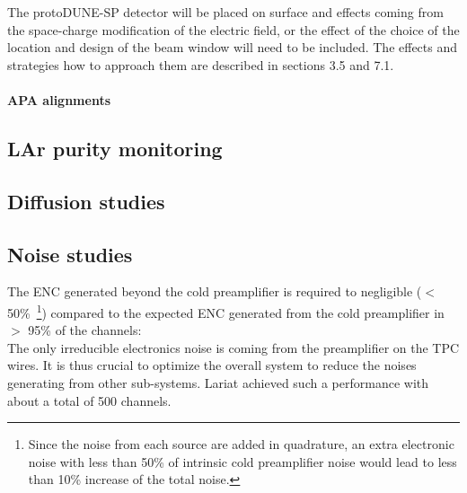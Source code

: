 
The protoDUNE-SP detector will be placed on surface and effects coming from the space-charge modification of the electric field, or the effect of the choice of the location and design of the beam window will need to be included. The effects and strategies how to approach them are described in sections 3.5 and 7.1.
		
		\paragraph{APA alignments}

	\subsection{LAr purity monitoring}

	\subsection{Diffusion studies}

	\subsection{Noise studies}
  
  The ENC generated beyond the cold preamplifier is required to negligible ($<$ 50\%~\footnote{Since the noise from each source are added in quadrature, an extra electronic noise with less than 50\% of intrinsic cold preamplifier
noise would lead to less than 10\% increase of the total noise.}) compared to the 
expected ENC generated from the cold preamplifier in $>$ 95\% of the channels: \\
The only irreducible electronics noise is coming from the preamplifier on the TPC wires. It is thus
crucial to optimize the overall system to reduce the noises generating from other sub-systems. 
Lariat achieved such a performance with about a total of 500 channels. 

